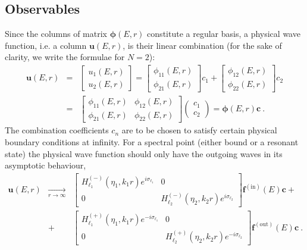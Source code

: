 \documentclass[12pt]{article}
\begin{document}
\subsection{Observables}
Since the columns of matrix $\bm{\phi}(E,r)$ constitute a regular basis, a physical
wave function, i.e. a column $\bm{u}(E,r)$, is their linear combination (for the
sake of clarity, we write the formulae for $N=2$):
\begin{eqnarray}
\nonumber
   \bm{u}(E,r) &=& \begin{bmatrix} u_1(E,r)\\ u_2(E,r)\end{bmatrix}=
   \begin{bmatrix} \phi_{11}(E,r)\\ \phi_{21}(E,r)\end{bmatrix}c_1+
   \begin{bmatrix} \phi_{12}(E,r)\\ \phi_{22}(E,r)\end{bmatrix}c_2\\[3mm]
\label{phys_comb}
   &=&
   \begin{bmatrix} \phi_{11}(E,r) & \phi_{12}(E,r)\\
			 \phi_{21}(E,r) & \phi_{22}(E,r)\end{bmatrix}
   \begin{pmatrix} c_1 \\ c_2 \end{pmatrix}
   =\bm{\phi}(E,r)\bm{c}\ .
\end{eqnarray}
The combination coefficients $c_n$ are to be chosen to satisfy certain physical
boundary conditions at infinity. For a spectral point (either bound or a
resonant state) the physical wave function should only have the outgoing waves
in its asymptotic behaviour,
\begin{eqnarray}
\nonumber
  \bm{u}(E,r)
  &\mathop{\longrightarrow}\limits_{r\to\infty}&
  \begin{bmatrix}
  H_{\ell_1}^{(-)}(\eta_1,k_1r)e^{i\sigma_{\ell_1}} & 0\\[3mm]
  0 & H_{\ell_2}^{(-)}(\eta_2,k_2r)e^{i\sigma_{\ell_2}}
  \end{bmatrix}
  \bm{f}^{\mathrm{(in)}}(E)\bm{c}
  +\\[3mm]
\label{spectral_bc}
  &+&
  \begin{bmatrix}
  H_{\ell_1}^{(+)}(\eta_1,k_1r)e^{-i\sigma_{\ell_1}} & 0\\[3mm]
  0 & H_{\ell_2}^{(+)}(\eta_2,k_2r)e^{-i\sigma_{\ell_2}}
  \end{bmatrix}
  \bm{f}^{\mathrm{(out)}}(E)\bm{c}\ .
\end{eqnarray}
\end{document}
